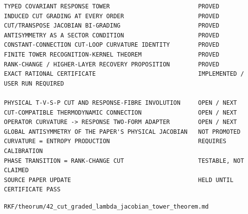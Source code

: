 \begin{verbatim}
TYPED COVARIANT RESPONSE TOWER                         PROVED
INDUCED CUT GRADING AT EVERY ORDER                     PROVED
CUT/TRANSPOSE JACOBIAN BI-GRADING                      PROVED
ANTISYMMETRY AS A SECTOR CONDITION                     PROVED
CONSTANT-CONNECTION CUT-LOOP CURVATURE IDENTITY        PROVED
FINITE TOWER RECOGNITION-KERNEL THEOREM                PROVED
RANK-CHANGE / HIGHER-LAYER RECOVERY PROPOSITION        PROVED
EXACT RATIONAL CERTIFICATE                             IMPLEMENTED / USER RUN REQUIRED

PHYSICAL T-V-S-P CUT AND RESPONSE-FIBRE INVOLUTION     OPEN / NEXT
CUT-COMPATIBLE THERMODYNAMIC CONNECTION                OPEN / NEXT
OPERATOR CURVATURE -> RESPONSE TWO-FORM ADAPTER        OPEN / NEXT
GLOBAL ANTISYMMETRY OF THE PAPER'S PHYSICAL JACOBIAN   NOT PROMOTED
CURVATURE = ENTROPY PRODUCTION                         REQUIRES CALIBRATION
PHASE TRANSITION = RANK-CHANGE CUT                     TESTABLE, NOT CLAIMED
SOURCE PAPER UPDATE                                    HELD UNTIL CERTIFICATE PASS
\end{verbatim}

\begin{flushright}\small\texttt{RKF/theorum/42\_cut\_graded\_lambda\_jacobian\_tower\_theorem.md}\end{flushright}
